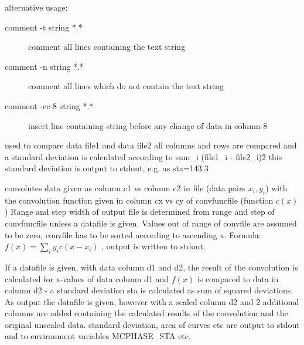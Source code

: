 \begin{description}
 alternative usage: 
\begin{description}\item [comment -t string *.* ] 
                      comment all lines containing the text string
                \item [comment -n string *.*]
                          comment all lines which do not contain the text string
                \item [comment -cc 8  string *.*]
                          insert line containing string before any change of data in column 8
\end{description}
\item [\prg compare\index{compare}\label{compare} file1 file2:] used to compare data file1 and data file2
                all columns and rows are compared and a standard deviation
                is calculated according to sum\_i (file1\_i - file2\_i)\^2
                this standard deviation is output to stdout, e.g. as sta=143.3
\item [\prg convolute\index{convolute}\label{convolute} c1 c2 file cx cy convfuncfile {[d1 d2 datafile]}:] %
convolutes data given as column c1 vs column
                       c2 in file (data pairs $x_i,y_i$) with the convolution function given in %
column cx vs cy
		        of convfuncfile (function $c(x)$)
		       Range and step width of output file is determined from range and step 
		        of convfuncfile  unless a datafile is given.  Values out of range of convfile are assumed to be zero,
			convfile has to be sorted according to ascending x.
			Formula: $f(x)=\sum_i y_i c(x-x_i)$ , 
		       output is written to stdout. 

                       If a datafile is given, 
		     with data column d1 and d2, the result of the convolution is
		     calculated for x-values of data column d1 and $f(x)$ is compared to
		     data in column d2 - a standard deviation sta is calculated as
		     sum of squared deviations. As output the datafile is given, however with a scaled column
                 d2 and 2 additional columns are added containing the calculated
                 results of the convolution and the original unscaled data.
                 standard deviation, area of curves etc are output to
                 stdout and to environment variables MCPHASE\_STA etc.


\end{description}
